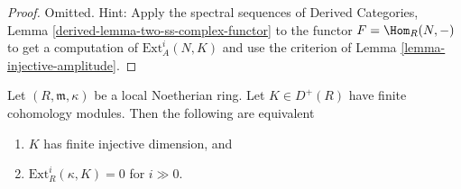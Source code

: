 \begin{proof}
Omitted. Hint: Apply the spectral sequences of
Derived Categories, Lemma \ref{derived-lemma-two-ss-complex-functor}
to the functor $F = \Hom_R(N, -)$ to get a computation of
$\text{Ext}^i_A(N, K)$ and use the criterion of
Lemma \ref{lemma-injective-amplitude}.
\end{proof}

\begin{lemma}
\label{lemma-finite-injective-dimension-Noetherian-local}
Let $(R, \mathfrak m, \kappa)$ be a local Noetherian ring.
Let $K \in D^+(R)$ have finite cohomology modules.
Then the following are equivalent
\begin{enumerate}
\item $K$ has finite injective dimension, and
\item $\text{Ext}^i_R(\kappa, K) = 0$ for $i \gg 0$.
\end{enumerate}
\end{lemma}

